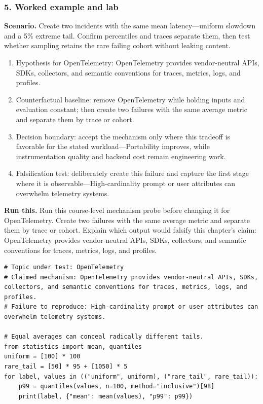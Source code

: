 \subsubsection*{5. Worked example and lab}
\textbf{Scenario.} Create two incidents with the same mean latency—uniform slowdown and a 5\% extreme tail. Confirm percentiles and traces separate them, then test whether sampling retains the rare failing cohort without leaking content.
\begin{enumerate}
\item Hypothesis for OpenTelemetry: OpenTelemetry provides vendor-neutral APIs, SDKs, collectors, and semantic conventions for traces, metrics, logs, and profiles.
\item Counterfactual baseline: remove OpenTelemetry while holding inputs and evaluation constant; then create two failures with the same average metric and separate them by trace or cohort.
\item Decision boundary: accept the mechanism only where this tradeoff is favorable for the stated workload—Portability improves, while instrumentation quality and backend cost remain engineering work.
\item Falsification test: deliberately create this failure and capture the first stage where it is observable—High-cardinality prompt or user attributes can overwhelm telemetry systems.
\end{enumerate}
\textbf{Run this.} Run this course-level mechanism probe before changing it for OpenTelemetry. Create two failures with the same average metric and separate them by trace or cohort. Explain which output would falsify this chapter's claim: OpenTelemetry provides vendor-neutral APIs, SDKs, collectors, and semantic conventions for traces, metrics, logs, and profiles.
\begin{Verbatim}[fontsize=\scriptsize]
# Topic under test: OpenTelemetry
# Claimed mechanism: OpenTelemetry provides vendor-neutral APIs, SDKs, collectors, and semantic conventions for traces, metrics, logs, and profiles.
# Failure to reproduce: High-cardinality prompt or user attributes can overwhelm telemetry systems.

# Equal averages can conceal radically different tails.
from statistics import mean, quantiles
uniform = [100] * 100
rare_tail = [50] * 95 + [1050] * 5
for label, values in (("uniform", uniform), ("rare_tail", rare_tail)):
    p99 = quantiles(values, n=100, method="inclusive")[98]
    print(label, {"mean": mean(values), "p99": p99})
\end{Verbatim}
